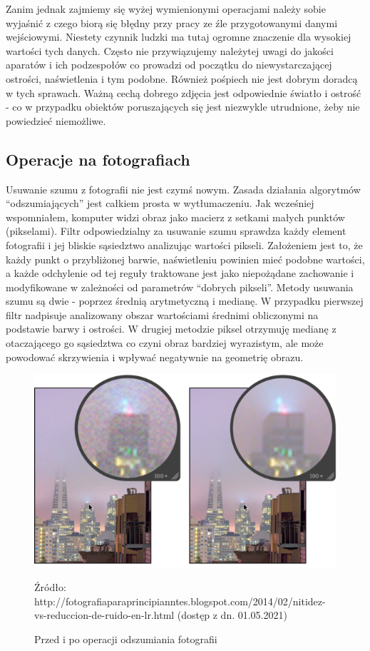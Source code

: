 \documentclass{article}
\begin{document}
	Zanim jednak zajmiemy się wyżej wymienionymi operacjami należy sobie wyjaśnić z czego biorą się błędny przy pracy ze źle przygotowanymi danymi wejściowymi. Niestety czynnik ludzki ma tutaj ogromne znaczenie dla wysokiej wartości tych danych. Często nie przywiązujemy należytej uwagi do jakości aparatów i ich podzespołów co prowadzi od początku do niewystarczającej ostrości, naświetlenia i tym podobne. Również pośpiech nie jest dobrym doradcą w tych sprawach. Ważną cechą dobrego zdjęcia jest odpowiednie światło i ostrość - co w przypadku obiektów poruszających się jest niezwykle utrudnione, żeby nie powiedzieć niemożliwe. 
	\subsection{Operacje na fotografiach}
	Usuwanie szumu z fotografii nie jest czymś nowym. Zasada działania algorytmów “odszumiających” jest całkiem prosta w wytłumaczeniu. Jak wcześniej wspomniałem, komputer widzi obraz jako macierz z setkami małych punktów (pikselami). Filtr odpowiedzialny za usuwanie szumu sprawdza każdy element fotografii i jej bliskie sąsiedztwo analizując wartości pikseli. Założeniem jest to, że każdy punkt o przybliżonej barwie, naświetleniu powinien mieć podobne wartości, a każde odchylenie od tej reguły traktowane jest jako niepożądane zachowanie i modyfikowane w zależności od parametrów “dobrych pikseli”. Metody usuwania szumu są dwie - poprzez średnią arytmetyczną i medianę. W przypadku pierwszej filtr nadpisuje analizowany obszar wartościami średnimi obliczonymi na podstawie barwy i ostrości. W drugiej metodzie piksel otrzymuję medianę z otaczającego go sąsiedztwa co czyni obraz bardziej wyrazistym, ale może powodować skrzywienia i wpływać negatywnie na geometrię obrazu.
	\begin{figure}
		\centering
		\includegraphics[width=15cm]{szum}
		\caption{Przed i po operacji odszumiania fotografii}
		Źródło: http://fotografiaparaprincipianntes.blogspot.com/2014/02/nitidez-vs-reduccion-de-ruido-en-lr.html (dostęp z dn. 01.05.2021)
	\end{figure}
\end{document}

